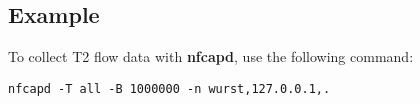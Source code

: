 \documentclass[documentation]{subfiles}
\begin{document}
\subsection{Example}
To collect T2 flow data with {\bf nfcapd}, use the following command:
\begin{center}
{\tt nfcapd -T all -B 1000000 -n wurst,127.0.0.1,.}
\end{center}

%
\end{document}
